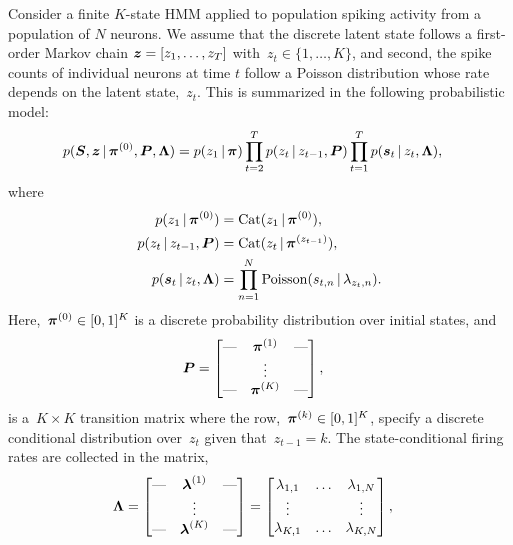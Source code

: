 Consider a finite $K$-state HMM applied to population spiking activity
from a population of $N$ neurons. We assume that the discrete latent
state follows a first-order Markov chain ${\boldsymbol{z} = \left[ z_1, \ldots,
    z_T\right]}$ with~$z_t \in \{1, \ldots, K\}$, and second, the
spike counts of individual neurons at time $t$ follow a Poisson
distribution whose rate depends on the latent state,~$z_t$. This is
summarized in the following probabilistic model:
\begin{align}
  p(\boldsymbol{S}, \boldsymbol{z} \,|\, \boldsymbol{\pi}^{(0)}, \boldsymbol{P}, \boldsymbol{\Lambda}) 
  &= p(z_1\,|\, \boldsymbol{\pi}) \prod_{t=2}^T p(z_t \,|\, z_{t-1}, \boldsymbol{P}) 
  \prod_{t=1}^T p(\boldsymbol{s}_t \,|\, z_t, \boldsymbol{\Lambda}),
\end{align}
where
\begin{align*}
  p(z_1 \,|\, \boldsymbol{\pi}^{(0)}) &= \mathrm{Cat}(z_1 \,|\, \boldsymbol{\pi}^{(0)}), \\
  p(z_t \,|\, z_{t-1}, \boldsymbol{P}) &= \mathrm{Cat}(z_t \,|\, \boldsymbol{\pi}^{(z_{t-1})}), \\
  p(\boldsymbol{s}_t \,|\, z_t, \boldsymbol{\Lambda}) &= \prod_{n=1}^N \mathrm{Poisson}(s_{t,n} \,|\, \lambda_{z_t,n}).
\end{align*}
Here,~$\boldsymbol{\pi}^{(0)} \in [0,1]^K$ is a discrete probability distribution over
initial states, and
\begin{align*}
  \boldsymbol{P} &=
        \begin{bmatrix}
          \text{---} &  \boldsymbol{\pi}^{(1)}  & \text{---} \\
            &  \vdots &   \\
          \text{---} &  \boldsymbol{\pi}^{(K)}  & \text{---}
        \end{bmatrix},
\end{align*}
is a~${K \times K}$ transition matrix where the row,~${\boldsymbol{\pi}^{(k)} \in
  [0,1]^K}$, specify a discrete conditional distribution over~$z_t$
given that~${z_{t-1}=k}$. 
The state-conditional firing rates are collected in the matrix,
\begin{align*}
  \boldsymbol{\Lambda} 
  &=
    \begin{bmatrix}
      \text{---} &  \boldsymbol{\lambda}^{(1)}  & \text{---} \\
      &  \vdots &   \\
      \text{---} &  \boldsymbol{\lambda}^{(K)}  & \text{---}
    \end{bmatrix}
   =
    \begin{bmatrix}
      \lambda_{1,1} & \ldots  & \lambda_{1,N}  \\
      \vdots        &         & \vdots  \\
      \lambda_{K,1} &  \ldots & \lambda_{K,N} 
    \end{bmatrix}, 
\end{align*}

